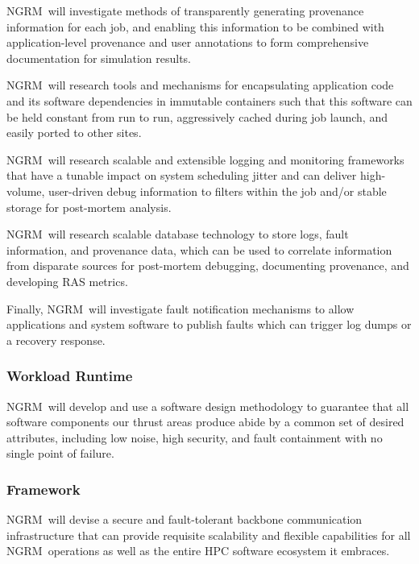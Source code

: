\documentclass{article}
\newcommand{\ngrm}{NGRM}
\begin{document}
\ngrm\ will investigate methods of transparently generating provenance
information for each job, and enabling this information to be combined
with application-level provenance and user annotations to form
comprehensive documentation for simulation results.

\ngrm\ will research tools and mechanisms for encapsulating application
code and its software dependencies in immutable containers such that
this software can be held constant from run to run, aggressively
cached during job launch, and easily ported to other sites.

\ngrm\ will research scalable and extensible logging and monitoring
frameworks that have a tunable impact on system scheduling jitter and
can deliver high-volume, user-driven debug information to filters within
the job and/or stable storage for post-mortem analysis.

\ngrm\ will research scalable database technology to store
logs, fault information, and provenance data, which can be used
to correlate information from disparate sources for post-mortem debugging,
documenting provenance, and developing RAS metrics.

Finally, \ngrm\ will investigate fault notification mechanisms
to allow applications and system software to publish
faults which can trigger log dumps or a recovery response.


\subsubsection{Workload Runtime}

\ngrm\ will develop and use a software design methodology to
guarantee that all software components our thrust areas produce
abide by a common set of desired attributes, including low noise,
high security, and fault containment with no single point of failure.

\subsubsection{Framework}
\ngrm\ will devise a secure and fault-tolerant backbone communication
infrastructure that can provide requisite scalability and flexible
capabilities for all \ngrm\ operations as well as the entire HPC
software ecosystem it embraces.
\end{document}
